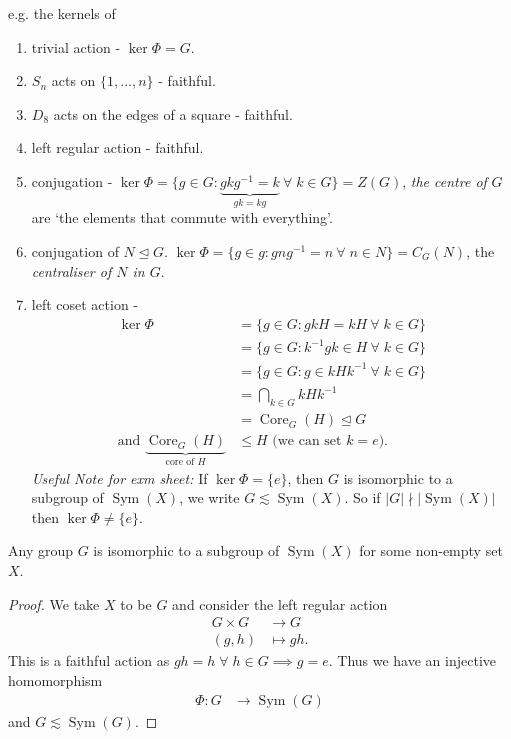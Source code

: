 \begin{remark}
\begin{enumerate}
        e.g. the kernels of 
        \begin{enumerate}
            \item trivial action - $\ker \Phi = G$.
            \item $S_n$ acts on $\{1, \ldots, n\}$ - faithful.
            \item $D_8$ acts on the edges of a square - faithful.
            \item left regular action - faithful.
            \item conjugation - $\ker \Phi = \{g \in G : \underbrace{g k g^{-1} = k}_{gk = kg} \ \forall \; k \in G\} = Z(G)$, \emph{the centre of} $G$ are `the elements that commute with everything'.
            \item conjugation of $N \trianglelefteq G$. $\ker \Phi = \{ g \in g : g n g^{-1} = n \ \forall \; n \in N\} = C_G(N)$, the \emph{centraliser of $N$ in $G$}.
            \item left coset action -
            \begin{align*}
                \ker \Phi &= \{ g \in G: g kH = kH \ \forall \; k \in G\} \\
                &= \{ g \in G: k^{-1}gk \in H \ \forall \; k \in G\} \\
                &= \{g \in G : g \in k H k^{-1} \ \forall \; k \in G\} \\
                &= \bigcap_{k \in G} k H k^{-1}  \\
                &= \operatorname{Core}_G(H) \trianglelefteq G \\
                \text{and } \underbrace{\operatorname{Core}_G(H)}_\text{core of $H$} &\leq H \text{ (we can set $k = e$)}.
            \end{align*} 
            \emph{Useful Note for exm sheet:} If $\ker \Phi = \{ e \}$, then $G$ is isomorphic to a subgroup of $\operatorname{Sym}(X)$, we write $G \lesssim \operatorname{Sym}(X)$.
            So if $|G| \nmid |\operatorname{Sym}(X)|$ then $\ker \Phi \neq \{e\}$.
        \end{enumerate} 
    \end{enumerate} 
\end{remark} 

\begin{theorem} \label{thm:7}
    Any group $G$ is isomorphic to a subgroup of $\operatorname{Sym}(X)$ for some non-empty set $X$.
\end{theorem} 

\begin{proof}
    We take $X$ to be $G$ and consider the left regular action
    \begin{align*}
        G \times G &\to G \\
        (g, h) &\mapsto gh.
    \end{align*} 
    This is a faithful action as $gh = h \; \forall \; h \in G \implies g = e$.
    Thus we have an injective homomorphism 
    \begin{align*}
        \Phi : G &\to \operatorname{Sym}(G)
    \end{align*} and $G \lesssim \operatorname{Sym}(G)$.
\end{proof} 

